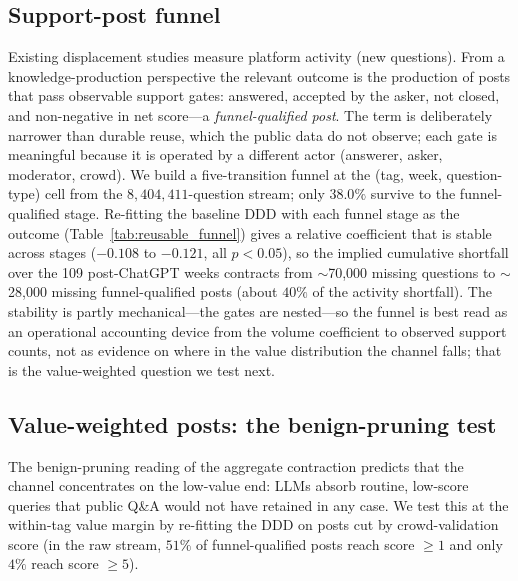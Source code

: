 \subsection{Support-post funnel}\label{ssec:results_funnel}

Existing displacement studies measure platform activity
(new questions). From a knowledge-production perspective the
relevant outcome is the production of posts that pass
observable support gates: answered, accepted by the asker,
not closed, and non-negative in net score---a
\emph{funnel-qualified post}. The term is deliberately
narrower than durable reuse, which the public data do not
observe; each gate is meaningful because it is operated by a
different actor (answerer, asker, moderator, crowd). We build
a five-transition funnel at the (tag, week, question-type)
cell from the $8{,}404{,}411$-question stream; only $38.0\%$
survive to the funnel-qualified stage. Re-fitting the
baseline DDD with each funnel stage as the outcome
(Table~\ref{tab:reusable_funnel}) gives a relative
coefficient that is stable across stages
($-0.108$ to $-0.121$, all $p<0.05$), so the implied
cumulative shortfall over the 109 post-ChatGPT weeks
contracts from $\sim$70{,}000 missing questions to
$\sim$28{,}000 missing funnel-qualified posts (about $40\%$
of the activity shortfall). The stability is partly
mechanical---the gates are nested---so the funnel is best
read as an operational accounting device from the volume
coefficient to observed support counts, not as evidence on
where in the value distribution the channel falls; that is
the value-weighted question we test next.



\subsection{Value-weighted posts: the benign-pruning
test}\label{ssec:results_value_weighted}

The benign-pruning reading of the aggregate contraction
\citep{xue2026chatgpt} predicts that the channel concentrates
on the low-value end: LLMs absorb routine, low-score queries
that public Q\&A would not have retained in any case. We test
this at the within-tag value margin by re-fitting the DDD on
posts cut by crowd-validation score (in the raw stream, $51\%$
of funnel-qualified posts reach score $\geq1$ and only $4\%$
reach score $\geq5$).

